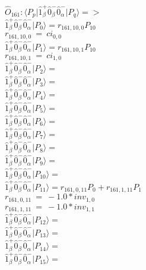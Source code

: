 \documentclass[14pt]{article}
\begin{document}
    $\hat{O}_{161}:  \langle{P_p}\vert \hat{1}_{\beta}^{+}\hat{0}_{\beta}^{-}\hat{0}_{\alpha}^{-} \vert{P_q}\rangle => $ \\ 
    $ \hat{1}_{\beta}^{+}\hat{0}_{\beta}^{-}\hat{0}_{\alpha}^{-} \vert{P_{0}}\rangle = {r}_{161,10,0}P_{10} $ \\ 
    ${r}_{161,10,0}\ =\ {ci}_{0,0} $ \\ 
    $ \hat{1}_{\beta}^{+}\hat{0}_{\beta}^{-}\hat{0}_{\alpha}^{-} \vert{P_{1}}\rangle = {r}_{161,10,1}P_{10} $ \\ 
    ${r}_{161,10,1}\ =\ {ci}_{1,0} $ \\ 
    $ \hat{1}_{\beta}^{+}\hat{0}_{\beta}^{-}\hat{0}_{\alpha}^{-} \vert{P_{2}}\rangle =  $ \\ 
    $ \hat{1}_{\beta}^{+}\hat{0}_{\beta}^{-}\hat{0}_{\alpha}^{-} \vert{P_{3}}\rangle =  $ \\ 
    $ \hat{1}_{\beta}^{+}\hat{0}_{\beta}^{-}\hat{0}_{\alpha}^{-} \vert{P_{4}}\rangle =  $ \\ 
    $ \hat{1}_{\beta}^{+}\hat{0}_{\beta}^{-}\hat{0}_{\alpha}^{-} \vert{P_{5}}\rangle =  $ \\ 
    $ \hat{1}_{\beta}^{+}\hat{0}_{\beta}^{-}\hat{0}_{\alpha}^{-} \vert{P_{6}}\rangle =  $ \\ 
    $ \hat{1}_{\beta}^{+}\hat{0}_{\beta}^{-}\hat{0}_{\alpha}^{-} \vert{P_{7}}\rangle =  $ \\ 
    $ \hat{1}_{\beta}^{+}\hat{0}_{\beta}^{-}\hat{0}_{\alpha}^{-} \vert{P_{8}}\rangle =  $ \\ 
    $ \hat{1}_{\beta}^{+}\hat{0}_{\beta}^{-}\hat{0}_{\alpha}^{-} \vert{P_{9}}\rangle =  $ \\ 
    $ \hat{1}_{\beta}^{+}\hat{0}_{\beta}^{-}\hat{0}_{\alpha}^{-} \vert{P_{10}}\rangle =  $ \\ 
    $ \hat{1}_{\beta}^{+}\hat{0}_{\beta}^{-}\hat{0}_{\alpha}^{-} \vert{P_{11}}\rangle = {r}_{161,0,11}P_{0}+{r}_{161,1,11}P_{1} $ \\ 
    ${r}_{161,0,11}\ =\ -1.0*{inv}_{1,0} $ \\ 
    ${r}_{161,1,11}\ =\ -1.0*{inv}_{1,1} $ \\ 
    $ \hat{1}_{\beta}^{+}\hat{0}_{\beta}^{-}\hat{0}_{\alpha}^{-} \vert{P_{12}}\rangle =  $ \\ 
    $ \hat{1}_{\beta}^{+}\hat{0}_{\beta}^{-}\hat{0}_{\alpha}^{-} \vert{P_{13}}\rangle =  $ \\ 
    $ \hat{1}_{\beta}^{+}\hat{0}_{\beta}^{-}\hat{0}_{\alpha}^{-} \vert{P_{14}}\rangle =  $ \\ 
    $ \hat{1}_{\beta}^{+}\hat{0}_{\beta}^{-}\hat{0}_{\alpha}^{-} \vert{P_{15}}\rangle =  $ \\ 
    
\end{document}
